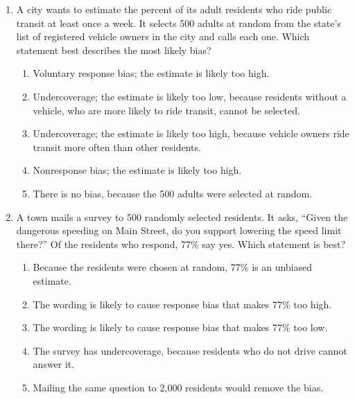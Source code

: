 \documentclass[12pt]{article}
\begin{document}
\begin{enumerate}[leftmargin=1.9em, itemsep=0.10in]

  \item A city wants to estimate the percent of its adult residents who ride public transit at
        least once a week. It selects 500 adults at random from the state's list of registered
        vehicle owners in the city and calls each one. Which statement best describes the most
        likely bias?
        \begin{enumerate}[label=\textbf{(\Alph*)}, leftmargin=2.2em, itemsep=1pt]
          \item Voluntary response bias; the estimate is likely too high.
          \item Undercoverage; the estimate is likely too low, because residents without a
                vehicle, who are more likely to ride transit, cannot be selected.
          \item Undercoverage; the estimate is likely too high, because vehicle owners ride
                transit more often than other residents.
          \item Nonresponse bias; the estimate is likely too high.
          \item There is no bias, because the 500 adults were selected at random.
                \hfill{}\rule[-0.2in]{0pt}{0.48in}
        \end{enumerate}

  \item A town mails a survey to 500 randomly selected residents. It asks, ``Given the
        dangerous speeding on Main Street, do you support lowering the speed limit there?''
        Of the residents who respond, 77\% say yes. Which statement is best?
        \begin{enumerate}[label=\textbf{(\Alph*)}, leftmargin=2.2em, itemsep=1pt]
          \item Because the residents were chosen at random, 77\% is an unbiased estimate.
          \item The wording is likely to cause response bias that makes 77\% too high.
          \item The wording is likely to cause response bias that makes 77\% too low.
          \item The survey has undercoverage, because residents who do not drive cannot
                answer it.
          \item Mailing the same question to 2{,}000 residents would remove the bias.
                \hfill{}\rule[-0.2in]{0pt}{0.48in}
        \end{enumerate}

\end{enumerate}
\end{document}
